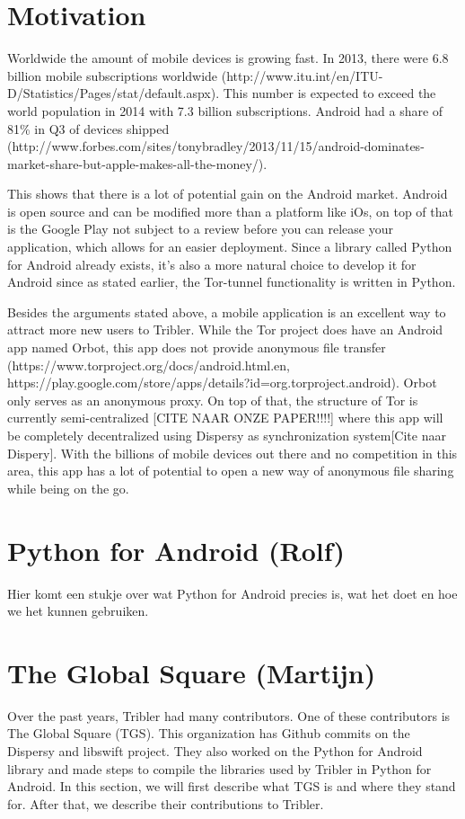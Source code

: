\documentclass[11pt]{article}
\begin{document}
\section{Motivation}
Worldwide the amount of mobile devices is growing fast. In 2013, there were 6.8 billion mobile subscriptions worldwide (http://www.itu.int/en/ITU-D/Statistics/Pages/stat/default.aspx). This number is expected to exceed the world population in 2014 with 7.3 billion subscriptions. Android had a share of 81\% in Q3 of devices shipped (http://www.forbes.com/sites/tonybradley/2013/11/15/android-dominates-market-share-but-apple-makes-all-the-money/).

This shows that there is a lot of potential gain on the Android market. Android is open source and can be modified more than a platform like iOs, on top of that is the Google Play not subject to a review before you can release your application, which allows for an easier deployment. Since a library called Python for Android already exists, it's also a more natural choice to develop it for Android since as stated earlier, the Tor-tunnel functionality is written in Python.

Besides the arguments stated above, a mobile application is an excellent way to attract more new users to Tribler. While the Tor project does have an Android app named Orbot, this app does not provide anonymous file transfer (https://www.torproject.org/docs/android.html.en, https://play.google.com/store/apps/details?id=org.torproject.android). Orbot only serves as an anonymous proxy. On top of that, the structure of Tor is currently semi-centralized [CITE NAAR ONZE PAPER!!!!] where this app will be completely decentralized using Dispersy as synchronization system[Cite naar Dispery]. With the billions of mobile devices out there and no competition in this area, this app has a lot of potential to open a new way of anonymous file sharing while being on the go.

\section{Python for Android (Rolf)}
Hier komt een stukje over wat Python for Android precies is, wat het doet en hoe we het kunnen gebruiken.

\section{The Global Square (Martijn)}
Over the past years, Tribler had many contributors. One of these contributors is The Global Square (TGS). This organization has Github commits on the Dispersy and libswift project. They also worked on the Python for Android library and made steps to compile the libraries used by Tribler in Python for Android. In this section, we will first describe what TGS is and where they stand for. After that, we describe their contributions to Tribler.
\end{document}
